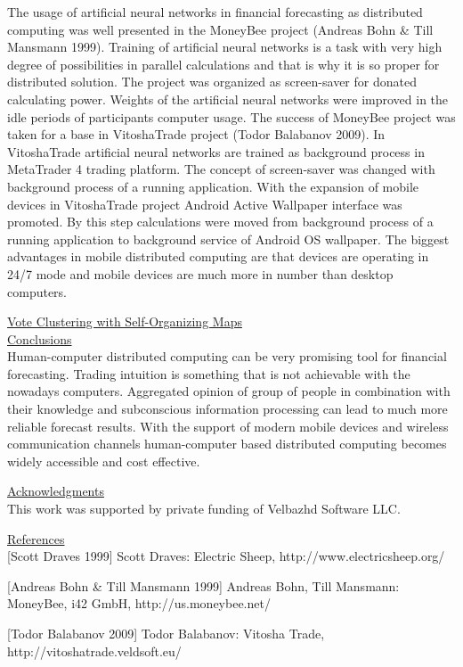 \documentclass{article}
\begin{document}
The usage of artificial neural networks in financial forecasting as distributed computing was well presented in the MoneyBee project (Andreas Bohn \& Till Mansmann 1999). Training of artificial neural networks is a task with very high degree of possibilities in parallel calculations and that is why it is so proper for distributed solution. The project was organized as screen-saver for donated calculating power. Weights of the artificial neural networks were improved in the idle periods of participants computer usage. The success of MoneyBee project was taken for a base in VitoshaTrade project (Todor Balabanov 2009). In VitoshaTrade artificial neural networks are trained as background process in MetaTrader 4 trading platform. The concept of screen-saver was changed with background process of a running application. With the expansion of mobile devices in VitoshaTrade project Android Active Wallpaper interface was promoted. By this step calculations were moved from background process of a running application to background service of Android OS wallpaper. The biggest advantages in mobile distributed computing are that devices are operating in 24/7 mode and mobile devices are much more in number than desktop computers.

\vspace*{3mm}
\underline{Vote Clustering with Self-Organizing Maps} \\

\vspace*{3mm}
\underline{Conclusions} \\

Human-computer distributed computing can be very promising tool for financial forecasting. Trading intuition is something that is not achievable with the nowadays computers. Aggregated opinion of group of people in combination with their knowledge and subconscious information processing can lead to much more reliable forecast results. With the support of modern mobile devices and wireless communication channels human-computer based distributed computing becomes widely accessible and cost effective. 

\vspace*{3mm}
\underline{Acknowledgments} \\

This work was supported by private funding of Velbazhd Software LLC.

\vspace*{3mm}
\underline{References} \\

[Scott Draves 1999] Scott Draves: Electric Sheep, http://www.electricsheep.org/

[Andreas Bohn \& Till Mansmann 1999] Andreas Bohn, Till Mansmann: MoneyBee, i42 GmbH, http://us.moneybee.net/

[Todor Balabanov 2009] Todor Balabanov: Vitosha Trade, http://vitoshatrade.veldsoft.eu/
\end{document}
